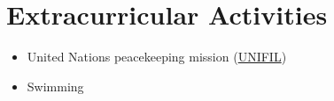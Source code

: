 \hypertarget{extracurricular-activities}{%
\section{Extracurricular Activities}\label{extracurricular-activities}}

\begin{itemize}
\tightlist
\item
  United Nations peacekeeping mission
  (\href{https://en.wikipedia.org/wiki/United_Nations_Interim_Force_in_Lebanon}{UNIFIL})
\item
  Swimming
\end{itemize}
